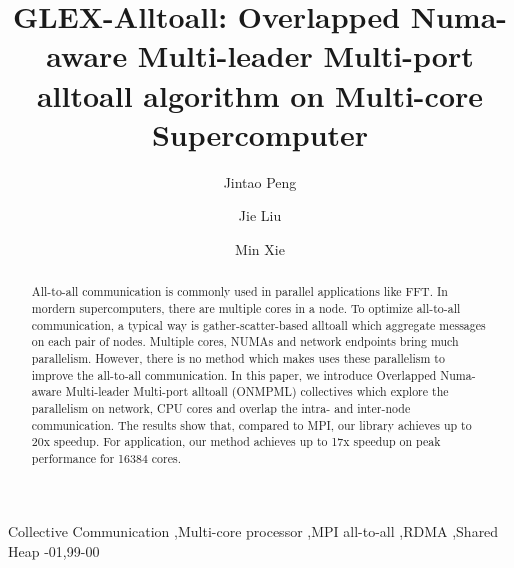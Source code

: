 \documentclass[5p,times]{elsarticle}
\begin{document}
\begin{frontmatter}

\title{GLEX-Alltoall: Overlapped Numa-aware Multi-leader Multi-port alltoall algorithm on Multi-core Supercomputer}

\author{Jintao Peng}
\author{Jie Liu}
\author{Min Xie}

\address{Changsha, China}



\begin{abstract}
		All-to-all communication is commonly used in parallel applications like FFT. 
		In mordern supercomputers, there are multiple cores in a node.
		To optimize all-to-all communication, a typical way is gather-scatter-based alltoall which aggregate messages on each pair of nodes.
		Multiple cores, NUMAs and network endpoints bring much parallelism. 
		However, there is no method which makes uses these parallelism to improve the all-to-all communication. 
		In this paper, we introduce Overlapped Numa-aware Multi-leader Multi-port alltoall (ONMPML) collectives which explore the parallelism on network, CPU cores and overlap the intra- and inter-node communication. 
		The results show that, compared to MPI, our library achieves up to 20x speedup. 
		For application, our method achieves up to 17x speedup on peak performance for 16384 cores.
\end{abstract}

 \begin{keyword}
 Collective Communication \sep Multi-core processor \sep MPI all-to-all \sep RDMA \sep Shared Heap
-01\sep  99-00
\end{keyword}

\end{frontmatter}

\linenumbers













\end{document}

